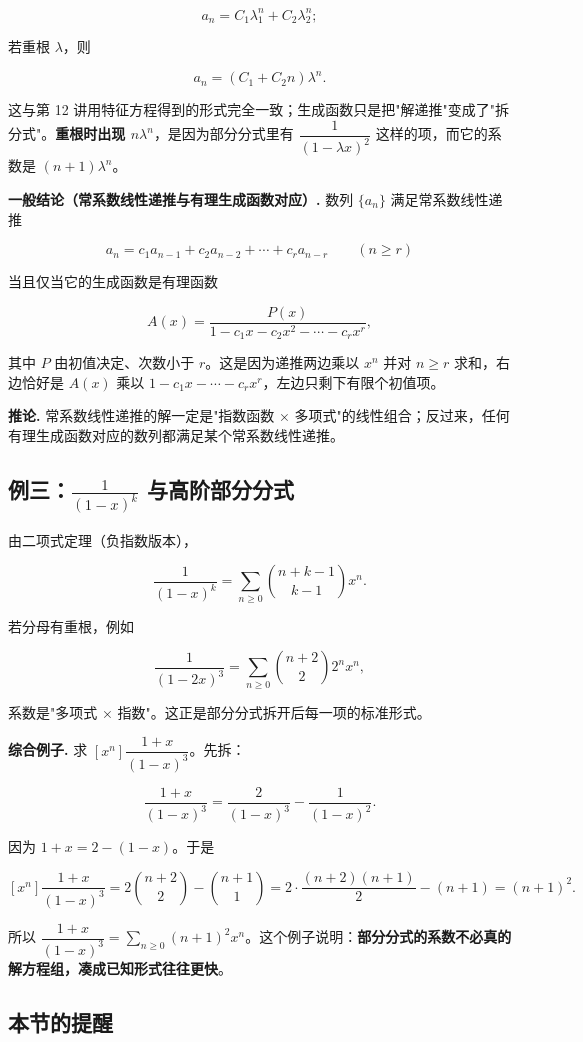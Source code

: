 \[
a_n=C_1\lambda_1^n+C_2\lambda_2^n;
\]

若重根 $\lambda$，则

\[
a_n=(C_1+C_2n)\lambda^n.
\]

这与第 12 讲用特征方程得到的形式完全一致；生成函数只是把"解递推"变成了"拆分式"。\textbf{重根时出现 $n\lambda^n$}，是因为部分分式里有 $\dfrac{1}{(1-\lambda x)^2}$ 这样的项，而它的系数是 $(n+1)\lambda^n$。

\textbf{一般结论（常系数线性递推与有理生成函数对应）.} 数列 $\{a_n\}$ 满足常系数线性递推

\[
a_n=c_1a_{n-1}+c_2a_{n-2}+\cdots+c_ra_{n-r}\qquad(n\ge r)
\]

当且仅当它的生成函数是有理函数

\[
A(x)=\frac{P(x)}{1-c_1x-c_2x^2-\cdots-c_rx^r},
\]

其中 $P$ 由初值决定、次数小于 $r$。这是因为递推两边乘以 $x^n$ 并对 $n\ge r$ 求和，右边恰好是 $A(x)$ 乘以 $1-c_1x-\cdots-c_rx^r$，左边只剩下有限个初值项。

\textbf{推论.} 常系数线性递推的解一定是"指数函数 × 多项式"的线性组合；反过来，任何有理生成函数对应的数列都满足某个常系数线性递推。

\subsection{例三：$\frac{1}{(1-x)^k}$ 与高阶部分分式}


由二项式定理（负指数版本），

\[
\frac{1}{(1-x)^k}=\sum_{n\ge0}\binom{n+k-1}{k-1}x^n.
\]

若分母有重根，例如

\[
\frac{1}{(1-2x)^3}=\sum_{n\ge0}\binom{n+2}{2}2^nx^n,
\]

系数是"多项式 × 指数"。这正是部分分式拆开后每一项的标准形式。

\textbf{综合例子.} 求 $[x^n]\dfrac{1+x}{(1-x)^3}$。先拆：

\[
\frac{1+x}{(1-x)^3}=\frac{2}{(1-x)^3}-\frac{1}{(1-x)^2}.
\]

因为 $1+x=2-(1-x)$。于是

\[
[x^n]\frac{1+x}{(1-x)^3}=2\binom{n+2}{2}-\binom{n+1}{1}
=2\cdot\frac{(n+2)(n+1)}{2}-(n+1)=(n+1)^2.
\]

所以 $\dfrac{1+x}{(1-x)^3}=\sum_{n\ge0}(n+1)^2x^n$。这个例子说明：\textbf{部分分式的系数不必真的解方程组，凑成已知形式往往更快}。

\subsection{本节的提醒}


